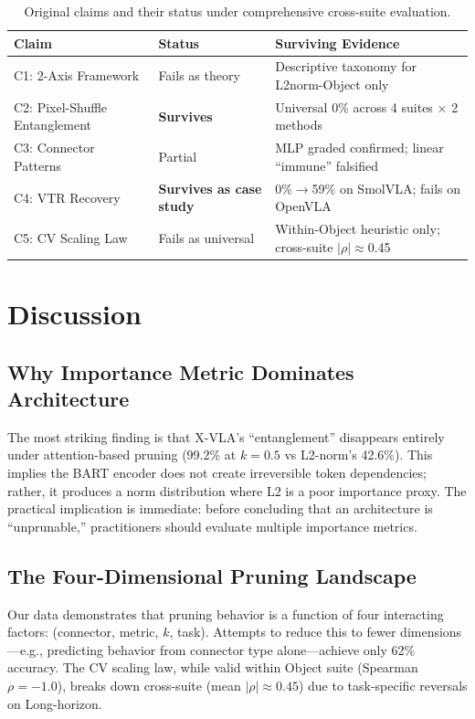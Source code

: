 \documentclass[letterpaper]{article}
\begin{document}
\begin{table}[h]
\centering
\caption{Original claims and their status under comprehensive cross-suite evaluation.}
\label{tab:claims}
\begin{tabular}{p{3.5cm}p{3cm}p{5cm}}
\toprule
Claim & Status & Surviving Evidence \\
\midrule
C1: 2-Axis Framework & Fails as theory & Descriptive taxonomy for L2norm-Object only \\
C2: Pixel-Shuffle Entanglement & \textbf{Survives} & Universal 0\% across 4 suites $\times$ 2 methods \\
C3: Connector Patterns & Partial & MLP graded confirmed; linear ``immune'' falsified \\
C4: VTR Recovery & \textbf{Survives as case study} & 0\%$\rightarrow$59\% on SmolVLA; fails on OpenVLA \\
C5: CV Scaling Law & Fails as universal & Within-Object heuristic only; cross-suite $|\rho|\approx$0.45 \\
\bottomrule
\end{tabular}
\end{table}

\section{Discussion}

\subsection{Why Importance Metric Dominates Architecture}

The most striking finding is that X-VLA's ``entanglement'' disappears entirely under attention-based pruning (99.2\% at $k=0.5$ vs L2-norm's 42.6\%).
This implies the BART encoder does not create irreversible token dependencies; rather, it produces a norm distribution where L2 is a poor importance proxy.
The practical implication is immediate: before concluding that an architecture is ``unprunable,'' practitioners should evaluate multiple importance metrics.

\subsection{The Four-Dimensional Pruning Landscape}

Our data demonstrates that pruning behavior is a function of four interacting factors: (connector, metric, $k$, task).
Attempts to reduce this to fewer dimensions---e.g., predicting behavior from connector type alone---achieve only 62\% accuracy.
The CV scaling law, while valid within Object suite (Spearman $\rho=-1.0$), breaks down cross-suite (mean $|\rho|\approx 0.45$) due to task-specific reversals on Long-horizon.
\end{document}
